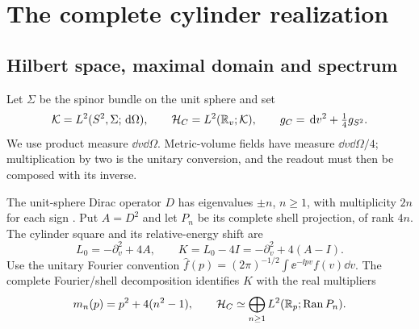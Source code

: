 \section{The complete cylinder realization}\label{sec:operator}

\subsection{Hilbert space, maximal domain and spectrum}
Let \(\Sigma\) be the spinor bundle on the unit sphere and set
\[
 \mathcal K=L^2(S^2,\Sigma;\,\mathrm d\Omega),\qquad
 \mathcal H_C=L^2(\mathbb R_v;\mathcal K),\qquad
 g_C=\,\mathrm d v^2+\tfrac14g_{S^2}.
\]
We use product measure \(\dd v\dd\Omega\). Metric-volume fields have
measure \(\dd v\dd\Omega/4\); multiplication by two is the unitary
conversion, and the readout must then be composed with its inverse.

The unit-sphere Dirac operator \(D\) has eigenvalues \(\pm n\),
\(n\geq1\), with multiplicity \(2n\) for each sign
\cite{CamporesiHiguchi1996}. Put \(A=D^2\) and let \(P_n\) be its
complete shell projection, of rank \(4n\). The cylinder square and its
relative-energy shift are
\begin{equation}\label{eq:K}
 L_0=-\partial_v^2+4A,\qquad
 K=L_0-4I=-\partial_v^2+4(A-I).
\end{equation}
Use the unitary Fourier convention
\(\widehat f(p)=(2\pi)^{-1/2}\int\ee^{-\ii pv}f(v)\dd v\).
The complete Fourier/shell decomposition identifies \(K\) with the
real multipliers
\[
 m_n(p)=p^2+4(n^2-1),\qquad
 \mathcal H_C\simeq\bigoplus_{n\geq1}L^2(\mathbb R_p;\operatorname{Ran} P_n).
\]

